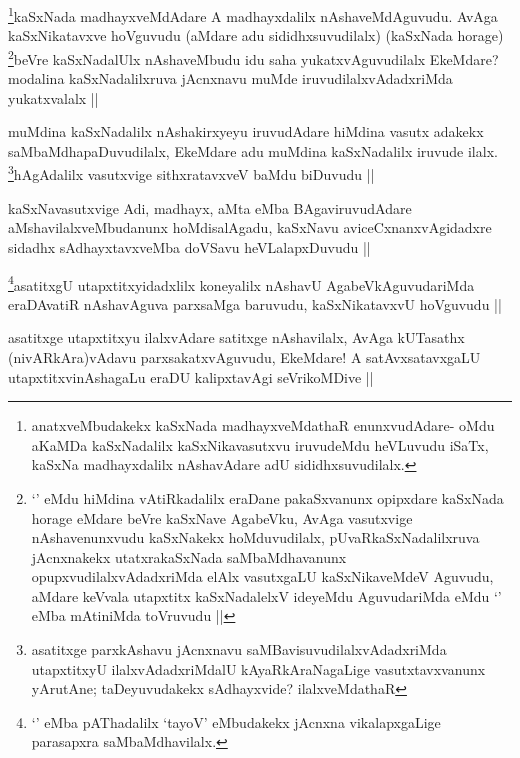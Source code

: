 \begin{artha}
\footnote{anatxveMbudakekx kaSxNada madhayxveMdathaR enunxvudAdare- oMdu aKaMDa kaSxNadalilx kaSxNikavasutxvu iruvudeMdu heVLuvudu iSaTx, kaSxNa madhayxdalilx nAshavAdare adU sididhxsuvudilalx.}kaSxNada madhayxveMdAdare A madhayxdalilx nAshaveMdAguvudu. AvAga kaSxNikatavxve hoVguvudu (aMdare adu sididhxsuvudilalx) (kaSxNada horage) \footnote{`\stext' eMdu hiMdina vAtiRkadalilx eraDane pakaSxvanunx opipxdare kaSxNada horage eMdare beVre kaSxNave AgabeVku, AvAga vasutxvige nAshavenunxvudu kaSxNakekx hoMduvudilalx, pUvaRkaSxNadalilxruva jAcnxnakekx utatxrakaSxNada saMbaMdhavanunx opupxvudilalxvAdadxriMda elAlx vasutxgaLU kaSxNikaveMdeV Aguvudu, aMdare keVvala utapxtitx kaSxNadalelxV ideyeMdu AguvudariMda eMdu `\stext' eMba mAtiniMda toVruvudu ||}beVre kaSxNadalUlx nAshaveMbudu idu saha yukatxvAguvudilalx EkeMdare? modalina kaSxNadalilxruva jAcnxnavu muMde iruvudilalxvAdadxriMda yukatxvalalx ||
\end{artha}

\begin{artha}
muMdina kaSxNadalilx nAshakirxyeyu iruvudAdare hiMdina vasutx adakekx saMbaMdhapaDuvudilalx, EkeMdare adu muMdina kaSxNadalilx iruvude ilalx. \footnote{asatitxge parxkAshavu jAcnxnavu saMBavisuvudilalxvAdadxriMda utapxtitxyU ilalxvAdadxriMdalU kAyaRkAraNagaLige vasutxtavxvanunx yArutAne; taDeyuvudakekx sAdhayxvide? ilalxveMdathaR}hAgAdalilx vasutxvige sithxratavxveV baMdu biDuvudu ||
\end{artha}

\begin{artha}
kaSxNavasutxvige Adi, madhayx, aMta eMba BAgaviruvudAdare aMshavilalxveMbudanunx hoMdisalAgadu, kaSxNavu aviceCxnanxvAgidadxre sidadhx sAdhayxtavxveMba doVSavu heVLalapxDuvudu ||
\end{artha}

\begin{artha}
\footnote{`\stext' eMba pAThadalilx `tayoV' eMbudakekx jAcnxna vikalapxgaLige parasapxra saMbaMdhavilalx.}asatitxgU utapxtitxyidadxlilx koneyalilx nAshavU AgabeVkAguvudariMda eraDAvatiR nAshavAguva parxsaMga baruvudu, kaSxNikatavxvU hoVguvudu ||
\end{artha}

\begin{artha}
asatitxge utapxtitxyu ilalxvAdare satitxge nAshavilalx, AvAga kUTasathx (nivARkAra)vAdavu parxsakatxvAguvudu, EkeMdare! A satAvxsatavxgaLU utapxtitxvinAshagaLu eraDU kalipxtavAgi seVrikoMDive ||
\end{artha}

